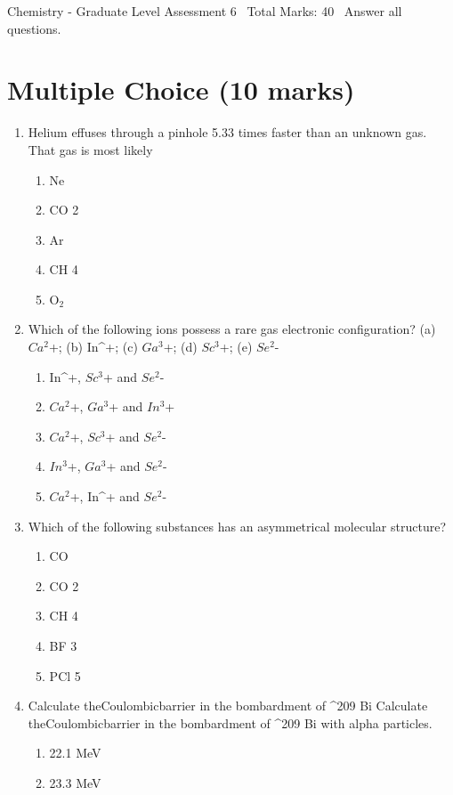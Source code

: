 \documentclass[12pt]{article}
\begin{document}
\begin{center}
Chemistry - Graduate Level Assessment 6 \
Total Marks: 40 \
Answer all questions.
\end{center}

\section*{Multiple Choice (10 marks)}
\begin{enumerate}[label=\arabic*.]
\item Helium effuses through a pinhole 5.33 times faster than an unknown gas. That gas is most likely
\begin{enumerate}[label=(\alph*)]
    \item Ne
    \item CO 2
    \item Ar
    \item CH 4
    \item O$_{2}$
\end{enumerate}
\item Which of the following ions possess a rare gas electronic configuration? (a) $Ca^2$+; (b) In^+; (c) $Ga^3$+; (d) $Sc^3$+; (e) $Se^2$-
\begin{enumerate}[label=(\alph*)]
    \item In^+, $Sc^3$+ and $Se^2$-
    \item $Ca^2$+, $Ga^3$+ and $In^3$+
    \item $Ca^2$+, $Sc^3$+ and $Se^2$-
    \item $In^3$+, $Ga^3$+ and $Se^2$-
    \item $Ca^2$+, In^+ and $Se^2$-
\end{enumerate}
\item Which of the following substances has an asymmetrical molecular structure?
\begin{enumerate}[label=(\alph*)]
    \item CO
    \item CO 2
    \item CH 4
    \item BF 3
    \item PCl 5
\end{enumerate}
\item Calculate theCoulombicbarrier in the bombardment of ^209 Bi Calculate theCoulombicbarrier in the bombardment of ^209 Bi with alpha particles.
\begin{enumerate}[label=(\alph*)]
    \item 22.1 MeV
    \item 23.3 MeV

\end{enumerate}
\end{enumerate}
\end{document}
